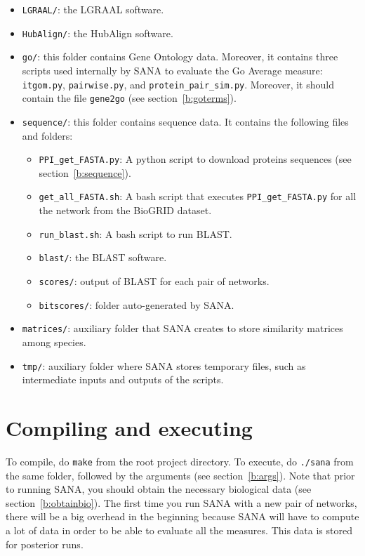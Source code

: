 \documentclass[]{article}
\begin{document}
\begin{itemize}
\item\verb|LGRAAL/|: the LGRAAL software.
\item\verb|HubAlign/|: the HubAlign software.
\item\verb|go/|: this folder contains Gene Ontology data. Moreover, it contains three scripts used internally by SANA to evaluate the Go Average measure: \texttt{itgom.py}, \texttt{pairwise.py}, and \texttt{protein\_pair\_sim.py}. Moreover, it should contain the file \texttt{gene2go} (see section~\ref{b:goterms}).
\item\verb|sequence/|: this folder contains sequence data. It contains the following files and folders:
\begin{itemize}
\item \texttt{PPI\_get\_FASTA.py}: A python script to download proteins sequences (see section~\ref{b:sequence}).
\item\texttt{get\_all\_FASTA.sh}: A bash script that executes \texttt{PPI\_get\_FASTA.py} for all the network from the BioGRID dataset.
\item\texttt{run\_blast.sh}: A bash script to run BLAST.
\item\texttt{blast/}: the BLAST software.
\item\texttt{scores/}: output of BLAST for each pair of networks.
\item\texttt{bitscores/}: folder auto-generated by SANA.
\end{itemize}
\item\verb|matrices/|: auxiliary folder that SANA creates to store similarity matrices among species.
\item\verb|tmp/|: auxiliary folder where SANA stores temporary files, such as intermediate inputs and outputs of the scripts.
\end{itemize}
\section{Compiling and executing}
To compile, do \texttt{make} from the root project directory. To execute, do \texttt{./sana} from the same folder, followed by the arguments (see section~\ref{b:args}). Note that prior to running SANA, you should obtain the necessary biological data (see section~\ref{b:obtainbio}). The first time you run SANA with a new pair of networks, there will be a big overhead in the beginning because SANA will have to compute a lot of data in order to be able to evaluate all the measures. This data is stored for posterior runs.
\end{document}
